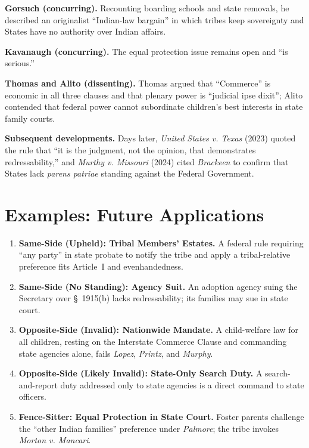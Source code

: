 \documentclass[12pt]{article}
\begin{document}
\textbf{Gorsuch (concurring).} Recounting boarding schools and state removals, he described an originalist ``Indian-law bargain'' in which tribes keep sovereignty and States have no authority over Indian affairs.

\textbf{Kavanaugh (concurring).} The equal protection issue remains open and ``is serious.''

\textbf{Thomas and Alito (dissenting).} Thomas argued that ``Commerce'' is economic in all three clauses and that plenary power is ``judicial ipse dixit''; Alito contended that federal power cannot subordinate children's best interests in state family courts.

\textbf{Subsequent developments.} Days later, \textit{United States v. Texas} (2023) quoted the rule that ``it is the judgment, not the opinion, that demonstrates redressability,'' and \textit{Murthy v. Missouri} (2024) cited \textit{Brackeen} to confirm that States lack \textit{parens patriae} standing against the Federal Government.

\section{Examples: Future Applications}

\begin{enumerate}
\item \textbf{Same-Side (Upheld): Tribal Members' Estates.} A federal rule requiring ``any party'' in state probate to notify the tribe and apply a tribal-relative preference fits Article~I and evenhandedness.
\item \textbf{Same-Side (No Standing): Agency Suit.} An adoption agency suing the Secretary over \S~1915(b) lacks redressability; its families may sue in state court.
\item \textbf{Opposite-Side (Invalid): Nationwide Mandate.} A child-welfare law for all children, resting on the Interstate Commerce Clause and commanding state agencies alone, fails \textit{Lopez}, \textit{Printz}, and \textit{Murphy}.
\item \textbf{Opposite-Side (Likely Invalid): State-Only Search Duty.} A search-and-report duty addressed only to state agencies is a direct command to state officers.
\item \textbf{Fence-Sitter: Equal Protection in State Court.} Foster parents challenge the ``other Indian families'' preference under \textit{Palmore}; the tribe invokes \textit{Morton v. Mancari}.
\end{enumerate}
\end{document}
